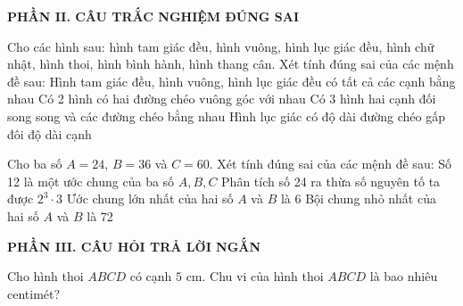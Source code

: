 \documentclass[12pt,a4paper]{article}
\begin{document}
\setcounter{ex}{0}
\noindent\textbf{\large PHẦN II. CÂU TRẮC NGHIỆM ĐÚNG SAI}
\vspace{1mm}
\begin{ex}
Cho các hình sau: hình tam giác đều, hình vuông, hình lục giác đều, hình chữ nhật, hình thoi, hình bình hành, hình thang cân. Xét tính đúng sai của các mệnh đề sau:
\choiceTF
{\True Hình tam giác đều, hình vuông, hình lục giác đều có tất cả các cạnh bằng nhau}
{\True Có 2 hình có hai đường chéo vuông góc với nhau}
{\True Có 3 hình hai cạnh đối song song và các đường chéo bằng nhau}
{Hình lục giác có độ dài đường chéo gấp đôi độ dài cạnh}
\end{ex}

\begin{ex}
Cho ba số $A = 24$, $B = 36$ và $C = 60$. Xét tính đúng sai của các mệnh đề sau:
\choiceTF
{\True Số 12 là một ước chung của ba số $A, B, C$}
{\True Phân tích số 24 ra thừa số nguyên tố ta được $2^3 \cdot 3$}
{Ước chung lớn nhất của hai số $A$ và $B$ là 6}
{\True Bội chung nhỏ nhất của hai số $A$ và $B$ là 72}
\end{ex}


\setcounter{ex}{0}
\noindent\textbf{\large PHẦN III. CÂU HỎI TRẢ LỜI NGẮN}
\vspace{1mm}
\begin{ex}
Cho hình thoi $ABCD$ có cạnh $5\text{ cm}$. Chu vi của hình thoi $ABCD$ là bao nhiêu centimét? 
\end{ex}
\end{document}
